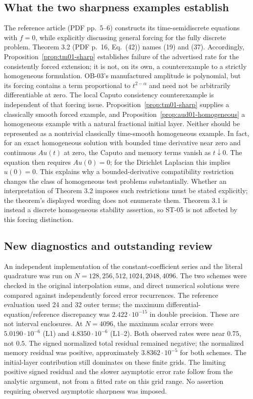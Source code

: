 \documentclass[11pt,a4paper]{amsart}
\theoremstyle{remark}
\theoremstyle{plain}
\theoremstyle{remark}
\numberwithin{equation}{section}
\begin{document}
\subsection{What the two sharpness examples establish}
The reference article (PDF pp.~5--6) constructs its time-semidiscrete equations with $f=0$, while explicitly discussing general forcing for the fully discrete problem. Theorem 3.2 (PDF p.~16, Eq.~(42)) names (19) and (37). Accordingly, Proposition~\ref{prop:tm01-sharp} establishes failure of the advertised rate for the consistently forced extension; it is not, on its own, a counterexample to a strictly homogeneous formulation. OB-03's manufactured amplitude is polynomial, but its forcing contains a term proportional to $t^{2-\alpha}$ and need not be arbitrarily differentiable at zero. The local Caputo consistency counterexample is independent of that forcing issue.
Proposition~\ref{prop:tm01-sharp} supplies a classically smooth forced example, and Proposition~\ref{prop:aud01-homogeneous} a homogeneous example with a natural fractional initial layer. Neither should be represented as a nontrivial classically time-smooth homogeneous example. In fact, for an exact homogeneous solution with bounded time derivative near zero and continuous $Au(t)$ at zero, the Caputo and memory terms vanish as $t\downarrow0$. The equation then requires $Au(0)=0$; for the Dirichlet Laplacian this implies $u(0)=0$. This explains why a bounded-derivative compatibility restriction changes the class of homogeneous test problems substantially. Whether an interpretation of Theorem 3.2 imposes such restrictions must be stated explicitly; the theorem's displayed wording does not enumerate them. Theorem 3.1 is instead a discrete homogeneous stability assertion, so ST-05 is not affected by this forcing distinction.

\subsection{New diagnostics and outstanding review}
An independent implementation of the constant-coefficient series and the literal quadrature was run on $N=128,256,512,1024,2048,4096$. The two schemes were checked in the original interpolation sums, and direct numerical solutions were compared against independently forced error recurrences. The reference evaluation used 24 and 32 outer terms; the maximum differential-equation/reference discrepancy was $2.422\cdot10^{-15}$ in double precision. These are not interval enclosures. At $N=4096$, the maximum scalar errors were $5.0190\cdot10^{-6}$ (L1) and $4.8350\cdot10^{-6}$ (L1--2). Both observed rates were near $0.75$, not $0.5$. The signed normalized total residual remained negative; the normalized memory residual was positive, approximately $3.8362\cdot10^{-5}$ for both schemes. The initial-layer contribution still dominates on these finite grids. The limiting positive signed residual and the slower asymptotic error rate follow from the analytic argument, not from a fitted rate on this grid range. No assertion requiring observed asymptotic sharpness was imposed.
\end{document}
